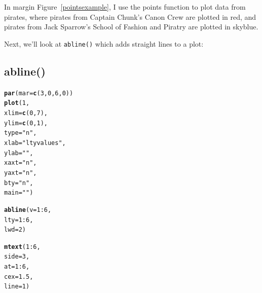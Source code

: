 \documentclass{tufte-book}\usepackage[]{graphicx}\usepackage[]{color}
\makeatletter
\newcommand{\hlnum}[1]{\textcolor[rgb]{0.686,0.059,0.569}{#1}}%
\newcommand{\hlstr}[1]{\textcolor[rgb]{0.192,0.494,0.8}{#1}}%
\newcommand{\hlopt}[1]{\textcolor[rgb]{0,0,0}{#1}}%
\newcommand{\hlstd}[1]{\textcolor[rgb]{0.345,0.345,0.345}{#1}}%
\newcommand{\hlkwc}[1]{\textcolor[rgb]{0.333,0.667,0.333}{#1}}%
\newcommand{\hlkwd}[1]{\textcolor[rgb]{0.737,0.353,0.396}{\textbf{#1}}}%
\newenvironment{kframe}{%
 \def\at@end@of@kframe{}%
 \ifinner\ifhmode%
  \def\at@end@of@kframe{\end{minipage}}%
  \begin{minipage}{\columnwidth}%
 \fi\fi%
 \def\FrameCommand##1{\hskip\@totalleftmargin \hskip-\fboxsep
 \colorbox{shadecolor}{##1}\hskip-\fboxsep
     \hskip-\linewidth \hskip-\@totalleftmargin \hskip\columnwidth}%
 \MakeFramed {\advance\hsize-\width
   \@totalleftmargin\z@ \linewidth\hsize
   \@setminipage}}%
 {\par\unskip\endMakeFramed%
 \at@end@of@kframe}
\newenvironment{knitrout}{}{} %
\makeatother
\begin{document}
In margin Figure~\ref{pointsexample}, I use the points function to plot data from pirates, where pirates from Captain Chunk's Canon Crew are plotted in red, and pirates from Jack Sparrow's School of Fashion and Piratry are plotted in skyblue.

Next, we'll look at \texttt{abline()} which adds straight lines to a plot:

\subsection{abline()}

\begin{marginfigure}
\begin{tiny}
\begin{knitrout}
\color{fgcolor}\begin{kframe}
\begin{alltt}
\hlkwd{par}\hlstd{(}\hlkwc{mar} \hlstd{=} \hlkwd{c}\hlstd{(}\hlnum{3}\hlstd{,} \hlnum{0}\hlstd{,} \hlnum{6}\hlstd{,} \hlnum{0}\hlstd{))}
\hlkwd{plot}\hlstd{(}\hlnum{1}\hlstd{,}
     \hlkwc{xlim} \hlstd{=} \hlkwd{c}\hlstd{(}\hlnum{0}\hlstd{,} \hlnum{7}\hlstd{),}
     \hlkwc{ylim} \hlstd{=} \hlkwd{c}\hlstd{(}\hlnum{0}\hlstd{,} \hlnum{1}\hlstd{),}
     \hlkwc{type} \hlstd{=} \hlstr{"n"}\hlstd{,}
     \hlkwc{xlab} \hlstd{=} \hlstr{"lty values"}\hlstd{,}
     \hlkwc{ylab} \hlstd{=} \hlstr{""}\hlstd{,}
     \hlkwc{xaxt} \hlstd{=} \hlstr{"n"}\hlstd{,}
     \hlkwc{yaxt} \hlstd{=} \hlstr{"n"}\hlstd{,}
     \hlkwc{bty} \hlstd{=} \hlstr{"n"}\hlstd{,}
     \hlkwc{main} \hlstd{=} \hlstr{""}\hlstd{)}

\hlkwd{abline}\hlstd{(}\hlkwc{v} \hlstd{=} \hlnum{1}\hlopt{:}\hlnum{6}\hlstd{,}
       \hlkwc{lty} \hlstd{=} \hlnum{1}\hlopt{:}\hlnum{6}\hlstd{,}
       \hlkwc{lwd} \hlstd{=} \hlnum{2}\hlstd{)}

\hlkwd{mtext}\hlstd{(}\hlnum{1}\hlopt{:}\hlnum{6}\hlstd{,}
      \hlkwc{side} \hlstd{=} \hlnum{3}\hlstd{,}
      \hlkwc{at} \hlstd{=} \hlnum{1}\hlopt{:}\hlnum{6}\hlstd{,}
      \hlkwc{cex} \hlstd{=} \hlnum{1.5}\hlstd{,}
      \hlkwc{line} \hlstd{=} \hlnum{1}\hlstd{)}


\end{alltt}
\end{kframe}
\end{knitrout}
\end{tiny}
\end{marginfigure}
\end{document}
